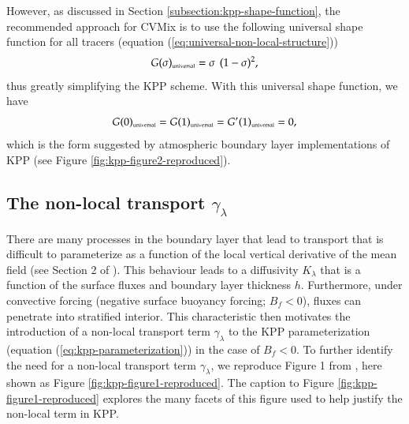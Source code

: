 However, as discussed in Section \ref{subsection:kpp-shape-function},
the recommended approach for CVMix is to use the following universal
shape function for all tracers (equation
(\ref{eq:universal-non-local-structure}))
\begin{equation}
 G(\sigma)_{\mbox{\tiny universal}} = \sigma \, \ (1-\sigma)^{2},
\end{equation}
thus greatly simplifying the KPP scheme. With this universal shape
function, we have
\begin{equation}
 G(0)_{\mbox{\tiny universal}}= G(1)_{\mbox{\tiny universal}} = G'(1)_{\mbox{\tiny universal}} = 0,
\end{equation}
which is the form suggested by atmospheric boundary layer
implementations of KPP (see Figure \ref{fig:kpp-figure2-reproduced}).


\subsection{The non-local transport $\gamma_{\lambda}$}
\label{subsection:kpp-nonlocal-transport-outline}

There are many processes in the boundary layer that lead to transport
that is difficult to parameterize as a function of the local vertical
derivative of the mean field (see Section 2 of \cite{LargeKPP}).  This
behaviour leads to a diffusivity $K_{\lambda}$ that is a function of
the surface fluxes and boundary layer thickness $h$.  Furthermore,
under convective forcing (negative surface buoyancy forcing; $B_{f} <
0$), fluxes can penetrate into stratified interior.  This
characteristic then motivates the introduction of a non-local
transport term $\gamma_{\lambda}$ to the KPP parameterization
(equation (\ref{eq:kpp-parameterization})) in the case of $B_{f} < 0$.
To further identify the need for a non-local transport term
$\gamma_{\lambda}$, we reproduce Figure 1 from \cite{LargeKPP}, here
shown as Figure \ref{fig:kpp-figure1-reproduced}.  The caption to
Figure \ref{fig:kpp-figure1-reproduced} explores the many facets of
this figure used to help justify the non-local term in KPP.

